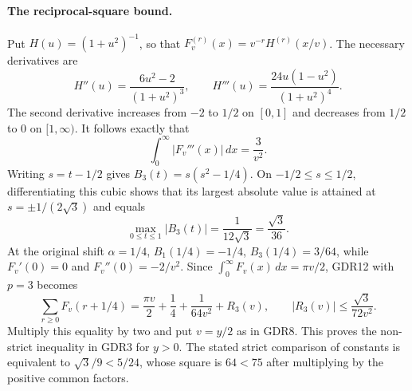 \documentclass[11pt,a4paper]{article}
\begin{document}
\paragraph{The reciprocal-square bound.}
Put $H(u)=(1+u^2)^{-1}$, so that
$F_v^{(r)}(x)=v^{-r}H^{(r)}(x/v)$. The necessary derivatives are
\[
 H''(u)=\frac{6u^2-2}{(1+u^2)^3},\qquad
 H'''(u)=\frac{24u(1-u^2)}{(1+u^2)^4}.
 \tag{GDR13}
\]
The second derivative increases from $-2$ to $1/2$ on $[0,1]$
and decreases from $1/2$ to $0$ on $[1,\infty)$. It follows exactly
that
\[
 \int_0^\infty|F_v'''(x)|\,dx=\frac3{v^2}.
 \tag{GDR14}
\]
Writing $s=t-1/2$ gives $B_3(t)=s(s^2-1/4)$. On
$-1/2\le s\le1/2$, differentiating this cubic shows that its
largest absolute value is attained at $s=\pm1/(2\sqrt3)$ and equals
\[
 \max_{0\le t\le1}|B_3(t)|=\frac1{12\sqrt3}
 =\frac{\sqrt3}{36}.
 \tag{GDR15}
\]
At the original shift $\alpha=1/4$,
$B_1(1/4)=-1/4$, $B_3(1/4)=3/64$, while
$F_v'(0)=0$ and $F_v''(0)=-2/v^2$. Since
$\int_0^\infty F_v(x)\,dx=\pi v/2$, GDR12 with $p=3$ becomes
\[
 \sum_{r\ge0}F_v(r+1/4)
 =\frac{\pi v}{2}+\frac14+\frac1{64v^2}+R_3(v),
 \qquad
 |R_3(v)|\le\frac{\sqrt3}{72v^2}.
 \tag{GDR16}
\]
Multiply this equality by two and put $v=y/2$ as in GDR8.
This proves the non-strict inequality in GDR3 for $y>0$.
The stated strict comparison of constants is equivalent to
$\sqrt3/9<5/24$, whose square is $64<75$ after multiplying
by the positive common factors.
\end{document}
